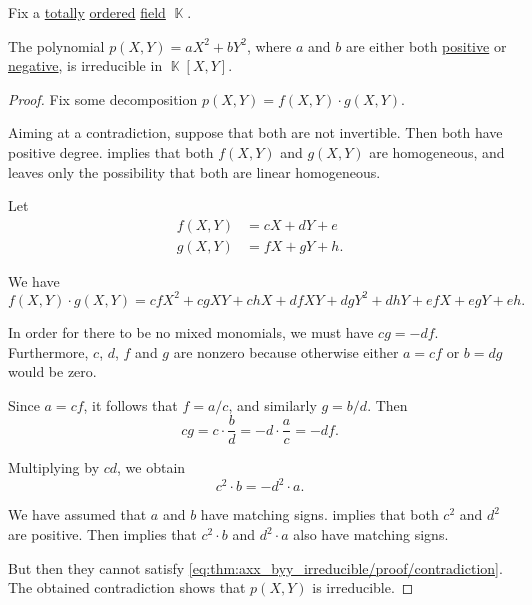 \begin{proposition}\label{thm:axx_byy_irreducible}
  Fix a \hyperref[def:totally_ordered_set]{totally} \hyperref[def:ordered_semiring]{ordered} \hyperref[def:field]{field} \( \BbbK \).

  The polynomial \( p(X, Y) = a X^2 + b Y^2 \), where \( a \) and \( b \) are either both \hyperref[def:ordered_semiring_positivity]{positive} or \hyperref[def:ordered_semiring_positivity]{negative}, is irreducible in \( \BbbK[X, Y] \).
\end{proposition}
\begin{proof}
  Fix some decomposition \( p(X, Y) = f(X, Y) \cdot g(X, Y) \).

  Aiming at a contradiction, suppose that both are not invertible. Then both have positive degree.  implies that both \( f(X, Y) \) and \( g(X, Y) \) are homogeneous, and  leaves only the possibility that both are linear homogeneous.

  Let
  \begin{align*}
    f(X, Y) &= c X + d Y + e \\
    g(X, Y) &= f X + g Y + h.
  \end{align*}

  We have
  \begin{equation*}
    f(X, Y) \cdot g(X, Y) = c f X^2 + c g X Y + c h X + d f X Y + d g Y^2 + d h Y + e f X + e g Y + e h.
  \end{equation*}

  In order for there to be no mixed monomials, we must have \( c g = - d f \). Furthermore, \( c \), \( d \), \( f \) and \( g \) are nonzero because otherwise either \( a = c f \) or \( b = d g \) would be zero.

  Since \( a = c f \), it follows that \( f = a / c \), and similarly \( g = b / d \). Then
  \begin{equation*}
    c g = c \cdot \frac b d = - d \cdot \frac a c = - d f.
  \end{equation*}

  Multiplying by \( cd \), we obtain
  \begin{equation}\label{eq:thm:axx_byy_irreducible/proof/contradiction}
    c^2 \cdot b = - d^2 \cdot a.
  \end{equation}

  We have assumed that \( a \) and \( b \) have matching signs.  implies that both \( c^2 \) and \( d^2 \) are positive. Then  implies that \( c^2 \cdot b \) and \( d^2 \cdot a \) also have matching signs.

  But then they cannot satisfy \eqref{eq:thm:axx_byy_irreducible/proof/contradiction}. The obtained contradiction shows that \( p(X, Y) \) is irreducible.
\end{proof}

